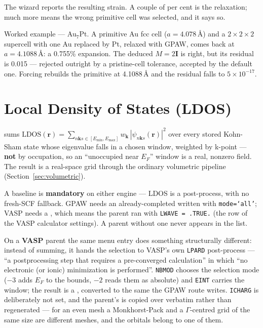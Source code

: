 The wizard reports the resulting strain. A couple of per cent is the
relaxation; much more means the wrong primitive cell was selected, and it says
so.

\begin{calnote}
Worked example --- Au$_7$Pt. A primitive Au fcc cell ($a = 4.078$\,\AA) and a
$2\times2\times2$ supercell with one Au replaced by Pt, relaxed with GPAW,
comes back at $a = 4.1088$\,\AA: a 0.755\% expansion. The deduced
$M = 2\mathbf{I}$ is right, but its residual is 0.015 --- rejected outright by
a pristine-cell tolerance, accepted by the default one. Forcing rebuilds the
primitive at 4.1088\,\AA{} and the residual falls to $5\times10^{-17}$.
\end{calnote}

\section{Local Density of States (LDOS)}
\label{sec:ldos}

\menusep{} sums
$\mathrm{LDOS}(\mathbf{r}) = \sum_{n\mathbf{k}s \in [E_{\min},E_{\max}]}
w_{\mathbf{k}} \, |\psi_{n\mathbf{k}s}(\mathbf{r})|^2$ over every stored
Kohn-Sham state whose eigenvalue falls in a chosen window, weighted by
k-point --- \textbf{not} by occupation, so an ``unoccupied near $E_F$''
window is a real, nonzero field. The result is a real-space grid through the
ordinary volumetric pipeline (Section~\ref{sec:volumetric}).

\begin{calwarn}
A baseline is \textbf{mandatory} on either engine --- LDOS is a
post-process, with no fresh-SCF fallback. GPAW needs an already-completed
 written with \texttt{mode=`all'}; VASP needs a
, which means the parent ran with \texttt{LWAVE = .TRUE.}
(the  row of the VASP calculator settings). A parent without one
never appears in the list.
\end{calwarn}

On a \textbf{VASP} parent the same menu entry does something structurally
different: instead of summing, it hands the selection to VASP's own
\texttt{LPARD} post-process --- ``a postprocessing step that requires a
pre-converged calculation'' in which ``no electronic (or ionic)
minimization is performed''. \texttt{NBMOD} chooses the selection mode
($-3$ adds $E_F$ to the bounds, $-2$ reads them as absolute) and
\texttt{EINT} carries the window; the result is a , converted
to the same  the GPAW route writes. \texttt{ICHARG} is
deliberately not set, and the parent's  is copied over
verbatim rather than regenerated --- for an even mesh a Monkhorst-Pack and
a $\Gamma$-centred grid of the same size are different meshes, and the
orbitals belong to one of them.

